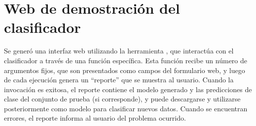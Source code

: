 %
%
\section{Web de demostración del clasificador}
%
Se generó una interfaz web utilizando la herramienta \eng{\webdemo{}}
\cite{webdemobuilder}, que interactúa con el clasificador a través de
una función específica.
Esta función recibe un número de argumentos fijos, que son presentados
como campos del formulario web, y luego de cada ejecución genera un
``reporte'' que se muestra al usuario.
Cuando la invocación es exitosa, el reporte contiene el modelo
generado y las predicciones de clase del conjunto de prueba (si
corresponde), y puede descargarse y utilizarse posteriormente como
modelo para clasificar nuevos datos.
Cuando se encuentran errores, el reporte informa al usuario del
problema ocurrido.

